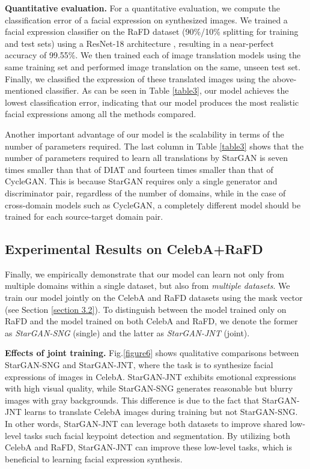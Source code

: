 \medskip

 \textbf{Quantitative evaluation.} For a quantitative evaluation, we compute the classification error of a facial expression on synthesized images. We trained a facial expression classifier on the RaFD dataset (90\%/10\% splitting for training and test sets) using a ResNet-18 architecture \cite{he2016deep}, resulting in a near-perfect accuracy of 99.55\%. We then trained each of image translation models using the same training set and performed image translation on the same, unseen test set. Finally, we classified the expression of these translated images using the above-mentioned classifier. As can be seen in Table \ref{table3}, our model achieves the lowest classification error, indicating that our model produces the most realistic facial expressions among all the methods compared.

Another important advantage of our model is the scalability in terms of the number of parameters required. The last column in Table \ref{table3} shows that the number of parameters required to learn all translations by StarGAN is seven times smaller than that of DIAT and fourteen times smaller than that of CycleGAN. This is because StarGAN requires only a single generator and discriminator pair, regardless of the number of domains, while in the case of cross-domain models such as CycleGAN, a completely different model should be trained for each source-target domain pair. 

\subsection{Experimental Results on CelebA+RaFD}

Finally, we empirically demonstrate that our model can learn not only from multiple domains within a single dataset, but also from \textit{multiple datasets}. We train our model jointly on the CelebA and RaFD datasets using the mask vector (see Section \ref{section 3.2}). To distinguish between the model trained only on RaFD and the model trained on both CelebA and RaFD, we denote the former as \textit{StarGAN-SNG} (single) and the latter as \textit{StarGAN-JNT} (joint). 

\smallskip

\textbf{Effects of joint training.} Fig.\thinspace\ref{figure6} shows qualitative comparisons between StarGAN-SNG and StarGAN-JNT, where the task is to synthesize facial expressions of images in CelebA. StarGAN-JNT exhibits emotional expressions with high visual quality, while StarGAN-SNG generates reasonable but blurry images with gray backgrounds. This difference is due to the fact that StarGAN-JNT learns to translate CelebA images during training but not StarGAN-SNG. In other words, StarGAN-JNT can leverage both datasets to improve shared low-level tasks such facial keypoint detection and segmentation. By utilizing both CelebA and RaFD, StarGAN-JNT can improve these low-level tasks, which is beneficial to learning facial expression synthesis. 

